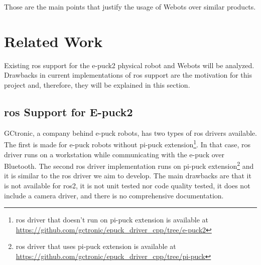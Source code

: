 Those are the main points that justify the usage of Webots over similar products.

\section{Related Work}
Existing \ac{ros} support for the e-puck2 physical robot and Webots will be analyzed.
Drawbacks in current implementations of \ac{ros} support are the motivation for this project and, therefore, they will be explained in this section.

\subsection{\ac{ros} Support for E-puck2}
GCtronic, a company behind e-puck robots, has two types of \ac{ros} drivers available.
The first is made for e-puck robots without pi-puck extension\footnote{\ac{ros} driver that doesn't run on pi-puck extension is available at \url{https://github.com/gctronic/epuck_driver_cpp/tree/e-puck2}}.
In that case, \ac{ros} driver runs on a workstation while communicating with the e-puck over Bluetooth. The second \ac{ros} driver implementation runs on pi-puck extension\footnote{\ac{ros} driver that uses pi-puck extension is available at \url{https://github.com/gctronic/epuck_driver_cpp/tree/pi-puck}} and it is similar to the \ac{ros} driver we aim to develop. The main drawbacks are that it is not available for \ac{ros2}, it is not unit tested nor code quality tested, it does not include a camera driver, and there is no comprehensive documentation.

